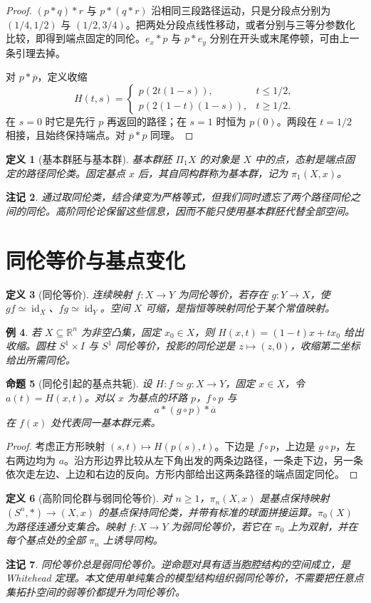 \documentclass[12pt,oneside,openany,fontset=none]{ctexbook}
\theoremstyle{cn}
\newtheorem{definition}{定义}[chapter]
\newtheorem{example}[definition]{例}
\newtheorem{proposition}[definition]{命题}
\newtheorem{remark}[definition]{注记}
\numberwithin{equation}{chapter}
\newcommand{\id}{\operatorname{id}}
\newcommand{\R}{\mathbb R}
\begin{document}
\begin{proof}
$(p*q)*r$ 与 $p*(q*r)$ 沿相同三段路径运动，只是分段点分别为 $(1/4,1/2)$ 与 $(1/2,3/4)$。把两处分段点线性移动，或者分别与三等分参数化比较，即得到端点固定的同伦。$e_x*p$ 与 $p*e_y$ 分别在开头或末尾停顿，可由上一条引理去掉。

对 $p*\overline p$，定义收缩
\[
H(t,s)=
\begin{cases}
p(2t(1-s)),&t\le1/2,\\
p(2(1-t)(1-s)),&t\ge1/2.
\end{cases}
\]
在 $s=0$ 时它是先行 $p$ 再返回的路径；在 $s=1$ 时恒为 $p(0)$。两段在 $t=1/2$ 相接，且始终保持端点。对 $\overline p*p$ 同理。
\end{proof}
\begin{definition}[基本群胚与基本群]
基本群胚 $\Pi_1X$ 的对象是 $X$ 中的点，态射是端点固定的路径同伦类。固定基点 $x$ 后，其自同构群称为基本群，记为 $\pi_1(X,x)$。
\end{definition}
\begin{remark}
通过取同伦类，结合律变为严格等式，但我们同时遗忘了两个路径同伦之间的同伦。高阶同伦论保留这些信息，因而不能只使用基本群胚代替全部空间。
\end{remark}

\section{同伦等价与基点变化}
\begin{definition}[同伦等价]
连续映射 $f:X\to Y$ 为同伦等价，若存在 $g:Y\to X$，使 $gf\simeq\id_X$、$fg\simeq\id_Y$。空间 $X$ 可缩，是指恒等映射同伦于某个常值映射。
\end{definition}
\begin{example}
若 $X\subseteq\R^n$ 为非空凸集，固定 $x_0\in X$，则 $H(x,t)=(1-t)x+tx_0$ 给出收缩。圆柱 $S^1\times I$ 与 $S^1$ 同伦等价，投影的同伦逆是 $z\mapsto(z,0)$，收缩第二坐标给出所需同伦。
\end{example}
\begin{proposition}[同伦引起的基点共轭]
设 $H:f\simeq g:X\to Y$，固定 $x\in X$，令 $a(t)=H(x,t)$。对以 $x$ 为基点的环路 $p$，$f\circ p$ 与
\[
a*(g\circ p)*\overline a
\]
在 $f(x)$ 处代表同一基本群元素。
\end{proposition}
\begin{proof}
考虑正方形映射 $(s,t)\mapsto H(p(s),t)$。下边是 $f\circ p$，上边是 $g\circ p$，左右两边均为 $a$。沿方形边界比较从左下角出发的两条边路径，一条走下边，另一条依次走左边、上边和右边的反向。方形内部给出这两条路径的端点固定同伦。
\end{proof}
\begin{definition}[高阶同伦群与弱同伦等价]
对 $n\ge1$，$\pi_n(X,x)$ 是基点保持映射 $(S^n,*)\to(X,x)$ 的基点保持同伦类，并带有标准的球面拼接运算。$\pi_0(X)$ 为路径连通分支集合。映射 $f:X\to Y$ 为弱同伦等价，若它在 $\pi_0$ 上为双射，并在每个基点处的全部 $\pi_n$ 上诱导同构。
\end{definition}
\begin{remark}
同伦等价总是弱同伦等价。逆命题对具有适当胞腔结构的空间成立，是 Whitehead 定理。本文使用单纯集合的模型结构组织弱同伦等价，不需要把任意点集拓扑空间的弱等价都提升为同伦等价。
\end{remark}
\end{document}
